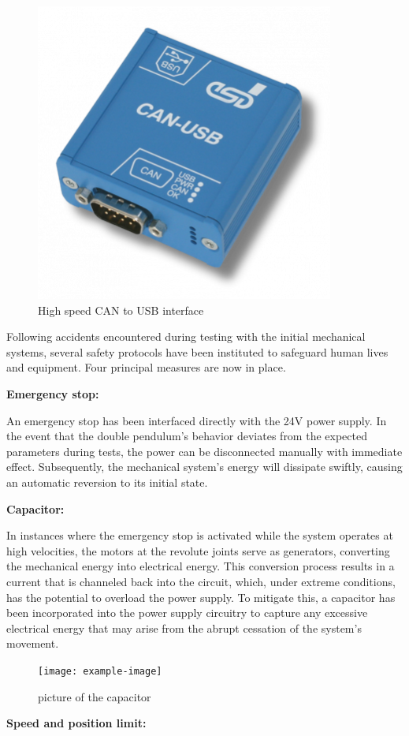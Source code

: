 \begin{figure}[H]
    \centering
    \includegraphics[width=0.4\linewidth]{figures/hardware_setup/can_blue_box.png}
    \caption{High speed CAN to USB interface\cite{esdCANUSB2}}
    \label{fig:can_blue_box}
\end{figure}

Following accidents encountered during testing with the initial mechanical systems, several safety protocols have been instituted to safeguard human lives and equipment. Four principal measures are now in place.

\textbf{Emergency stop:}

An emergency stop has been interfaced directly with the 24V power supply. In the event that the double pendulum's behavior deviates from the expected parameters during tests, the power can be disconnected manually with immediate effect. Subsequently, the mechanical system's energy will dissipate swiftly, causing an automatic reversion to its initial state.

\textbf{Capacitor:}

In instances where the emergency stop is activated while the system operates at high velocities, the motors at the revolute joints serve as generators, converting the mechanical energy into electrical energy. This conversion process results in a current that is channeled back into the circuit, which, under extreme conditions, has the potential to overload the power supply. To mitigate this, a capacitor has been incorporated into the power supply circuitry to capture any excessive electrical energy that may arise from the abrupt cessation of the system's movement.

\begin{figure}[H]
    \centering
    \texttt{[image: example-image]}
    \caption{picture of the capacitor}
    \label{fig:example_figure}
\end{figure}

\textbf{Speed and position limit:}

